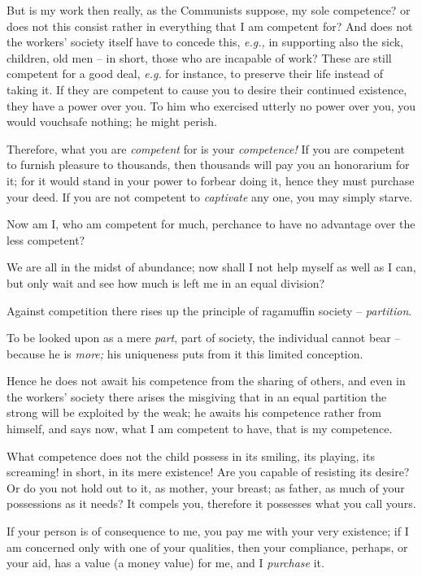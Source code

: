 \documentclass[12pt,a4paper]{book}
\begin{document}
But is my work then really, as the Communists suppose, my sole competence? or 
does not this consist rather in everything that I am competent for? And does 
not the workers' society itself have to concede this, \textit{e.g.,} in 
supporting also the sick, children, old men -- in short, those who are 
incapable of work? These are still competent for a good deal, \textit{e.g.} 
for instance, to preserve their life instead of taking it. If they are 
competent to cause you to desire their continued existence, they have a power 
over you. To him who exercised utterly no power over you, you would vouchsafe 
nothing; he might perish.

Therefore, what you are \textit{competent} for is your \textit{competence!} If 
you are competent to furnish pleasure to thousands, then thousands will pay 
you an honorarium for it; for it would stand in your power to forbear doing 
it, hence they must purchase your deed. If you are not competent to 
\textit{captivate} any one, you may simply starve.

Now am I, who am competent for much, perchance to have no advantage over the 
less competent?

We are all in the midst of abundance; now shall I not help myself as well as I 
can, but only wait and see how much is left me in an equal division?

Against competition there rises up the principle of ragamuffin society -- 
\textit{partition}.

To be looked upon as a mere \textit{part}, part of society, the individual 
cannot bear -- because he is \textit{more;} his uniqueness puts from it this 
limited conception.

Hence he does not await his competence from the sharing of others, and even in 
the workers' society there arises the misgiving that in an equal partition the 
strong will be exploited by the weak; he awaits his competence rather from 
himself, and says now, what I am competent to have, that is my competence.

What competence does not the child possess in its smiling, its playing, its 
screaming! in short, in its mere existence! Are you capable of resisting its 
desire? Or do you not hold out to it, as mother, your breast; as father, as 
much of your possessions as it needs? It compels you, therefore it possesses 
what you call yours.

If your person is of consequence to me, you pay me with your very existence; 
if I am concerned only with one of your qualities, then your compliance, 
perhaps, or your aid, has a value (a money value) for me, and I 
\textit{purchase} it.
\end{document}
